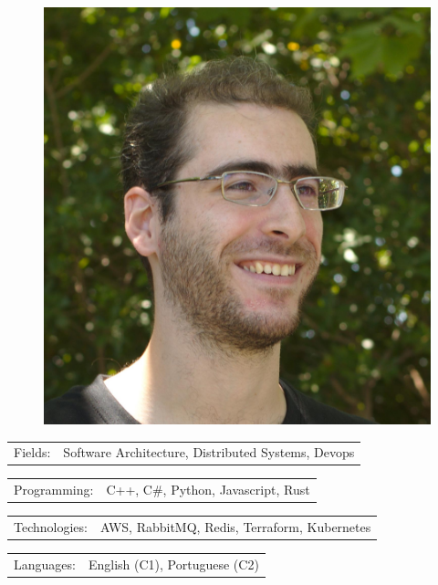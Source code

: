 \documentclass[10pt,A4]{extarticle}
\newcommand{\tzlarrow}{(0,0) -- (0.2,0) -- (0.3,0.2) -- (0.2,0.4) -- (0,0.4) -- (0.1,0.2) -- cycle;}
\newcommand{\larrow}[1]
{\begin{tikzpicture}[scale=0.58]
	 \filldraw[fill=#1!100,draw=#1!100!black]  \tzlarrow
 \end{tikzpicture}
}
\newcommand{\metasection}[2]
{
\begin{tabular*}{1\textwidth}{p{2.6cm} p{11cm}}
\larrow{bgcol}	\normalsize{\textcolor{sectcol}{#1}}&#2\\[6pt]
\end{tabular*}
}
\begin{document}
\pagestyle{fancy}	


\vspace{-20.55pt}

\hspace{-0.25\linewidth}\colorbox{bgcol}{}



\begin{figure}[H]
\begin{flushright}
	\includegraphics[clip,width=0.18\linewidth]{myfoto.jpg}	%
\end{flushright}
\end{figure}



\vspace{-110pt}

\metasection{Fields:}{Software Architecture, Distributed Systems, Devops} 
\metasection{Programming:}{C++, C\#, Python, Javascript, Rust}
\metasection{Technologies:}{AWS, RabbitMQ, Redis, Terraform, Kubernetes}
\metasection{Languages:}{English (C1), Portuguese (C2)}
\end{document}
